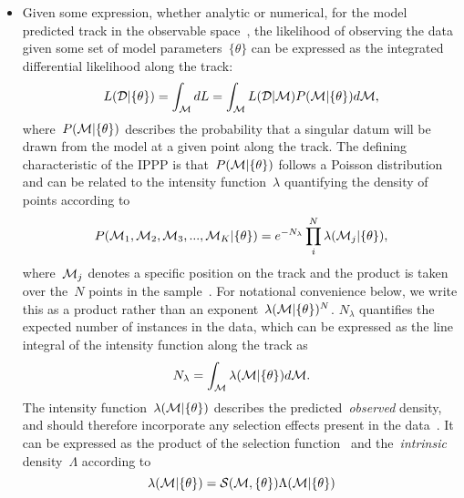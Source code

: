 \documentclass[ms.tex]{subfiles}
\begin{document}
\begin{itemize}
	\item Given some expression, whether analytic or numerical, for the model
	predicted track in the observable space~, the likelihood of
	observing the data given some set of model parameters~$\{\theta\}$ can be
	expressed as the integrated differential likelihood along the track:
	\begin{equation}
	L(\mathcal{D} | \{\theta\}) = \int_{\mathcal{M}} dL =
	\int_{\mathcal{M}} L(\mathcal{D} | \mathcal{M}) P(\mathcal{M} | \{\theta\})
	d\mathcal{M},
	\end{equation}
	where~$P(\mathcal{M} | \{\theta\})$ describes the probability that a
	singular datum will be drawn from the model at a given point along the
	track.
	The defining characteristic of the IPPP is that~$P(\mathcal{M} | \{\theta\})$
	follows a Poisson distribution and can be related to the intensity
	function~$\lambda$ quantifying the density of points according to
	\begin{equation}
	P(\mathcal{M}_1, \mathcal{M}_2, \mathcal{M}_3, ..., \mathcal{M}_K | \{\theta\})
	= e^{-N_\lambda}\prod_i^N \lambda(\mathcal{M}_j | \{\theta\}),
	\end{equation}
	where~$\mathcal{M}_j$ denotes a specific position on the track and the
	product is taken over the~$N$ points in the sample~.
	For notational convenience below, we write this as a product rather than
	an exponent~$\lambda(\mathcal{M} | \{\theta\})^N$.
	$N_\lambda$ quantifies the expected number of instances in the data, which
	can be expressed as the line integral of the intensity function along the
	track as
	\begin{equation}
	N_\lambda = \int_{\mathcal{M}} \lambda(\mathcal{M} | \{\theta\}) d\mathcal{M}.
	\end{equation}
	The intensity function~$\lambda(\mathcal{M} | \{\theta\})$ describes the
	predicted~\textit{observed} density, and should therefore incorporate any
	selection effects present in the data~.
	It can be expressed as the product of the selection function~
	and the~\textit{intrinsic} density~$\Lambda$ according to
	\begin{equation}
	\lambda(\mathcal{M} | \{\theta\}) = \mathcal{S}(\mathcal{M}, \{\theta\})
	\Lambda(\mathcal{M} | \{\theta\})
	\label{eq:lambda_def}
	\end{equation}


\end{itemize}
\end{document}
